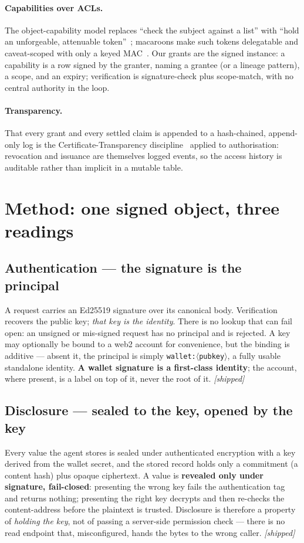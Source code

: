 \documentclass[11pt]{article}
\begin{document}
\paragraph{Capabilities over ACLs.} The object-capability model replaces ``check the
subject against a list'' with ``hold an unforgeable, attenuable token''~\cite{ocap};
macaroons make such tokens delegatable and caveat-scoped with only a keyed
MAC~\cite{macaroons}. Our grants are the signed instance: a capability is a row
signed by the granter, naming a grantee (or a lineage pattern), a scope, and an
expiry; verification is signature-check plus scope-match, with no central authority
in the loop.

\paragraph{Transparency.} That every grant and every settled claim is appended to a
hash-chained, append-only log is the Certificate-Transparency
discipline~\cite{rfc6962} applied to authorisation: revocation and issuance are
themselves logged events, so the access history is auditable rather than implicit in
a mutable table.

\section{Method: one signed object, three readings}

\subsection{Authentication --- the signature is the principal}
A request carries an Ed25519 signature over its canonical body. Verification
recovers the public key; \emph{that key is the identity}. There is no lookup that
can fail open: an unsigned or mis-signed request has no principal and is rejected. A
key may optionally be bound to a web2 account for convenience, but the binding is
additive --- absent it, the principal is simply \texttt{wallet:$\langle$pubkey$\rangle$},
a fully usable standalone identity. \textbf{A wallet signature is a first-class
identity}; the account, where present, is a label on top of it, never the root of
it. \emph{[shipped]}

\subsection{Disclosure --- sealed to the key, opened by the key}
Every value the agent stores is sealed under authenticated encryption with a key
derived from the wallet secret, and the stored record holds only a commitment (a
content hash) plus opaque ciphertext. A value is \textbf{revealed only under
signature, fail-closed}: presenting the wrong key fails the authentication tag and
returns nothing; presenting the right key decrypts and then re-checks the
content-address before the plaintext is trusted. Disclosure is therefore a property
of \emph{holding the key}, not of passing a server-side permission check --- there
is no read endpoint that, misconfigured, hands the bytes to the wrong caller.
\emph{[shipped]}
\end{document}
